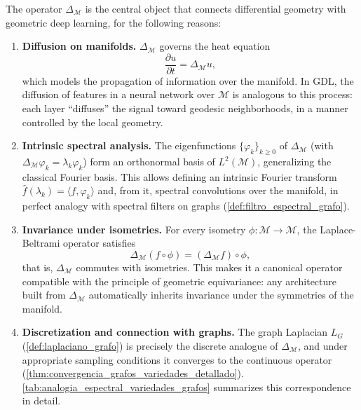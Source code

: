\begin{remark}\label{rem:laplace_beltrami_gdl}
The operator $\Delta_\mathcal{M}$ is the central object that connects differential geometry with geometric deep learning, for the following reasons:

\begin{enumerate}
    \item \textbf{Diffusion on manifolds.} $\Delta_\mathcal{M}$ governs the heat equation
    \[
    \frac{\partial u}{\partial t} = \Delta_\mathcal{M} u,
    \]
    which models the propagation of information over the manifold. In GDL, the diffusion of features in a neural network over $\mathcal{M}$ is analogous to this process: each layer ``diffuses'' the signal toward geodesic neighborhoods, in a manner controlled by the local geometry.

    \item \textbf{Intrinsic spectral analysis.} The eigenfunctions $\{\varphi_k\}_{k \geq 0}$ of $\Delta_\mathcal{M}$ (with $\Delta_\mathcal{M} \varphi_k = \lambda_k \varphi_k$) form an orthonormal basis of $L^2(\mathcal{M})$, generalizing the classical Fourier basis. This allows defining an intrinsic Fourier transform $\hat{f}(\lambda_k) = \langle f, \varphi_k \rangle$ and, from it, spectral convolutions over the manifold, in perfect analogy with spectral filters on graphs (\autoref{def:filtro_espectral_grafo}).

    \item \textbf{Invariance under isometries.} For every isometry $\phi: \mathcal{M} \to \mathcal{M}$, the Laplace-Beltrami operator satisfies
    \[
    \Delta_\mathcal{M}(f \circ \phi) = (\Delta_\mathcal{M} f) \circ \phi,
    \]
    that is, $\Delta_\mathcal{M}$ commutes with isometries. This makes it a canonical operator compatible with the principle of geometric equivariance: any architecture built from $\Delta_\mathcal{M}$ automatically inherits invariance under the symmetries of the manifold.

    \item \textbf{Discretization and connection with graphs.} The graph Laplacian $L_G$ (\autoref{def:laplaciano_grafo}) is precisely the discrete analogue of $\Delta_\mathcal{M}$, and under appropriate sampling conditions it converges to the continuous operator (\autoref{thm:convergencia_grafos_variedades_detallado}). \autoref{tab:analogia_espectral_variedades_grafos} summarizes this correspondence in detail.
\end{enumerate}
\end{remark}

